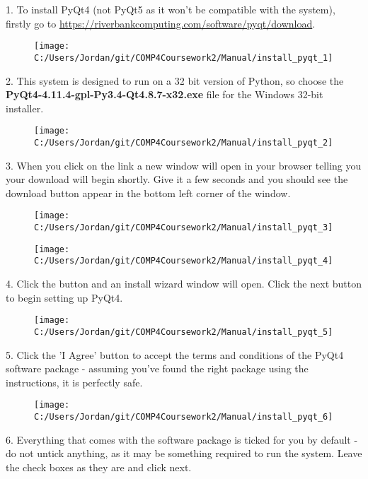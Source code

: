 1. To install PyQt4 (not PyQt5 as it won't be compatible with the system), firstly go to \url{https://riverbankcomputing.com/software/pyqt/download}.

\begin{figure}[H]
    \texttt{[image: C:/Users/Jordan/git/COMP4Coursework2/Manual/install\_pyqt\_1]}
\end{figure}

2. This system is designed to run on a 32 bit version of Python, so choose the \textbf{PyQt4-4.11.4-gpl-Py3.4-Qt4.8.7-x32.exe} file for the Windows 32-bit installer.

\begin{figure}[H]
    \texttt{[image: C:/Users/Jordan/git/COMP4Coursework2/Manual/install\_pyqt\_2]}
\end{figure}

3. When you click on the link a new window will open in your browser telling you your download will begin shortly. Give it a few seconds and you should see the download button appear in the bottom left corner of the window.

\begin{figure}[H]
    \texttt{[image: C:/Users/Jordan/git/COMP4Coursework2/Manual/install\_pyqt\_3]}
\end{figure}

\begin{figure}[H]
    \texttt{[image: C:/Users/Jordan/git/COMP4Coursework2/Manual/install\_pyqt\_4]}
\end{figure}

4. Click the button and an install wizard window will open. Click the next button to begin setting up PyQt4.

\begin{figure}[H]
    \texttt{[image: C:/Users/Jordan/git/COMP4Coursework2/Manual/install\_pyqt\_5]}
\end{figure}

5. Click the 'I Agree' button to accept the terms and conditions of the PyQt4 software package - assuming you've found the right package using the instructions, it is perfectly safe.

\begin{figure}[H]
    \texttt{[image: C:/Users/Jordan/git/COMP4Coursework2/Manual/install\_pyqt\_6]}
\end{figure}

6. Everything that comes with the software package is ticked for you by default - do not untick anything, as it may be something required to run the system. Leave the check boxes as they are and click next.

